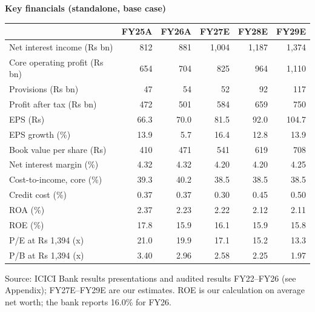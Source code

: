 \documentclass[10pt,a4paper]{article}
\begin{document}
\medskip
\begin{center}\small
\textbf{Key financials (standalone, base case)}\\[2pt]
\begin{tabular}{lrrrrr}
\toprule
 & FY25A & FY26A & FY27E & FY28E & FY29E \\
\midrule
Net interest income (Rs bn) & 812 & 881 & 1,004 & 1,187 & 1,374 \\
Core operating profit (Rs bn) & 654 & 704 & 825 & 964 & 1,110 \\
Provisions (Rs bn) & 47 & 54 & 52 & 92 & 117 \\
Profit after tax (Rs bn) & 472 & 501 & 584 & 659 & 750 \\
EPS (Rs) & 66.3 & 70.0 & 81.5 & 92.0 & 104.7 \\
EPS growth (\%) & 13.9 & 5.7 & 16.4 & 12.8 & 13.9 \\
Book value per share (Rs) & 410 & 471 & 541 & 619 & 708 \\
Net interest margin (\%) & 4.32 & 4.32 & 4.20 & 4.20 & 4.25 \\
Cost-to-income, core (\%) & 39.3 & 40.2 & 38.5 & 38.5 & 38.5 \\
Credit cost (\%) & 0.37 & 0.37 & 0.30 & 0.45 & 0.50 \\
ROA (\%) & 2.37 & 2.23 & 2.22 & 2.12 & 2.11 \\
ROE (\%) & 17.8 & 15.9 & 16.1 & 15.9 & 15.8 \\
\midrule
P/E at Rs 1,394 (x) & 21.0 & 19.9 & 17.1 & 15.2 & 13.3 \\
P/B at Rs 1,394 (x) & 3.40 & 2.96 & 2.58 & 2.25 & 1.97 \\
\bottomrule
\end{tabular}
\end{center}
{\footnotesize Source: ICICI Bank results presentations and audited results FY22--FY26 (see Appendix); FY27E--FY29E are our estimates. ROE is our calculation on average net worth; the bank reports 16.0\% for FY26.}

\newpage
\end{document}

